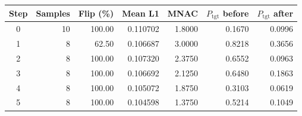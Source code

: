 \begin{tabular}{crrrrrr}
\hline
Step & Samples & Flip (\%) & Mean L1 & MNAC & $P_{\mathrm{tgt}}$ before & $P_{\mathrm{tgt}}$ after \\
\hline
0 & 10 & 100.00 & 0.110702 & 1.8000 & 0.1670 & 0.0996 \\
1 & 8 & 62.50 & 0.106687 & 3.0000 & 0.8218 & 0.3656 \\
2 & 8 & 100.00 & 0.107320 & 2.3750 & 0.6552 & 0.0963 \\
3 & 8 & 100.00 & 0.106692 & 2.1250 & 0.6480 & 0.1863 \\
4 & 8 & 100.00 & 0.105072 & 1.8750 & 0.3103 & 0.0619 \\
5 & 8 & 100.00 & 0.104598 & 1.3750 & 0.5214 & 0.1049 \\
\hline
\end{tabular}
